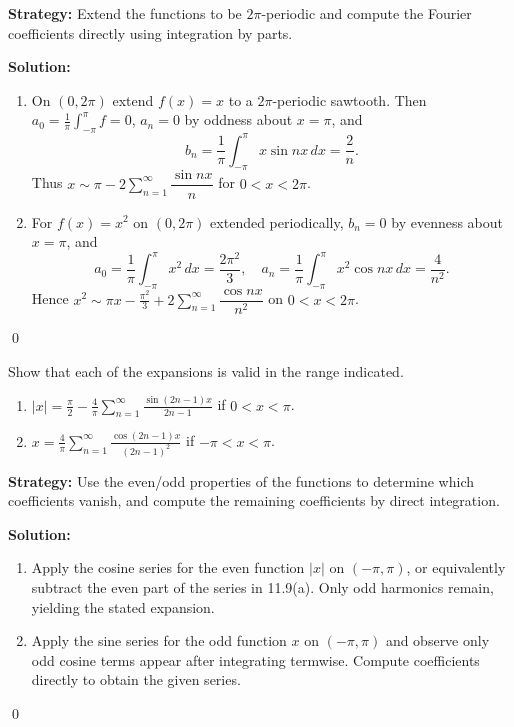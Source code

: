 \noindent\textbf{Strategy:} Extend the functions to be $2\pi$-periodic and compute the Fourier coefficients directly using integration by parts.

\bigskip\noindent\textbf{Solution:}
\begin{enumerate}[label=(\alph*)]
\item On $(0,2\pi)$ extend $f(x)=x$ to a $2\pi$-periodic sawtooth. Then $a_0=\tfrac{1}{\pi}\int_{-\pi}^{\pi} f=0$, $a_n=0$ by oddness about $x=\pi$, and
\[b_n=\frac{1}{\pi}\int_{-\pi}^{\pi} x\sin nx\,dx=\frac{2}{n}.\]
Thus $x\sim \pi-2\sum_{n=1}^{\infty} \dfrac{\sin nx}{n}$ for $0<x<2\pi$.
\item For $f(x)=x^2$ on $(0,2\pi)$ extended periodically, $b_n=0$ by evenness about $x=\pi$, and
\[a_0=\frac{1}{\pi}\int_{-\pi}^{\pi} x^2\,dx=\frac{2\pi^2}{3},\quad a_n=\frac{1}{\pi}\int_{-\pi}^{\pi} x^2\cos nx\,dx=\frac{4}{n^2}.\]
Hence $x^2\sim \pi x-\tfrac{\pi^2}{3}+2\sum_{n=1}^{\infty}\dfrac{\cos nx}{n^2}$ on $0<x<2\pi$.
\end{enumerate}\qed


\begin{problembox}
\begin{problemstatement}
Show that each of the expansions is valid in the range indicated.
\begin{enumerate}[label=(\alph*)]
\item $|x| = \frac{\pi}{2} - \frac{4}{\pi} \sum_{n=1}^\infty \frac{\sin (2n - 1)x}{2n - 1}$ if $0 < x < \pi$.
\item $x = \frac{4}{\pi} \sum_{n=1}^\infty \frac{\cos (2n - 1)x}{(2n - 1)^2}$ if $-\pi < x < \pi$.
\end{enumerate}
\end{problemstatement}
\end{problembox}

\noindent\textbf{Strategy:} Use the even/odd properties of the functions to determine which coefficients vanish, and compute the remaining coefficients by direct integration.

\bigskip\noindent\textbf{Solution:}
\begin{enumerate}[label=(\alph*)]
\item Apply the cosine series for the even function $|x|$ on $(-\pi,\pi)$, or equivalently subtract the even part of the series in 11.9(a). Only odd harmonics remain, yielding the stated expansion.
\item Apply the sine series for the odd function $x$ on $(-\pi,\pi)$ and observe only odd cosine terms appear after integrating termwise. Compute coefficients directly to obtain the given series.
\end{enumerate}\qed


